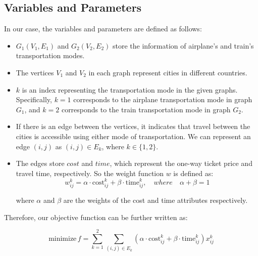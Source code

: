 \documentclass{extarticle}
\begin{document}
\subsection*{Variables and Parameters}
In our case, the variables and parameters are defined as follows:
\begin{itemize}
  \item $G_1(V_1, E_1)$ and $G_2(V_2, E_2)$ store the information of airplane's and train's transportation modes.
  \item The vertices $V_1$ and $V_2$ in each graph represent cities in different
        countries.
  \item $k$ is an index representing the transportation mode in the given graphs. Specifically, $k = 1$ corresponds to the airplane transportation mode in graph $G_1$, and $k = 2$ corresponds to the train transportation mode in graph $G_2$.
  \item If there is an edge between the vertices, it indicates that travel between the
        cities is accessible using either mode of transportation. We can represent an
        edge $(i, j)$ as $(i, j) \in E_k$, where $k \in \{1, 2\}$.
  \item The edges store $cost$ and $time$, which represent the one-way ticket price and
        travel time, respectively. So the weight function $w$ is defined as:
        \begin{equation*}
          w_{ij}^k = \alpha \cdot \text{cost}_{ij}^k + \beta \cdot \text{time}_{ij}^k, \quad where \quad \alpha + \beta = 1
        \end{equation*}

        where $\alpha$ and $\beta$ are the weights of the cost and time attributes
        respectively.

\end{itemize}
Therefore, our objective function can be further written as:

\begin{equation*}
  \text{minimize}\, f = \sum_{k=1}^{2} \sum_{(i,j) \in E_k} (\alpha \cdot \text{cost}_{ij}^k + \beta \cdot \text{time}_{ij}^k) x_{ij}^k
\end{equation*}
\end{document}

